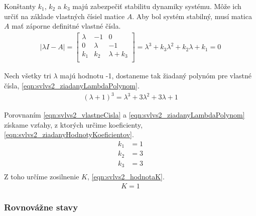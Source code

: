 \documentclass[../main.tex]{subfiles}
\begin{document}
Konštanty $k_1$, $k_2$ a $k_3$ majú zabezpečiť stabilitu dynamiky systému. Môže ich určiť na základe vlastných čísiel matice $A$. Aby bol systém stabilný, musí matica $A$ mať záporne definitné vlastné čísla.
	\begin{equation}
		\begin{aligned}
		|\lambda I-A| =
			\begin{bmatrix} 
			\lambda & -1 & 0 \\ 
			0 & \lambda & -1 \\ 
			k_1 & k_2 & \lambda+k_3  \\ 
			\end{bmatrix} = \lambda^3 + k_3 \lambda^2 +  k_2 \lambda + k_1 = 0
		\end{aligned}
		\label{eqn:svlvs2_vlastneCisla}
	\end{equation}

Nech všetky tri $\lambda$ majú hodnotu -1, dostaneme tak žiadaný polynóm pre vlastné čísla, \cref{eqn:svlvs2_ziadanyLambdaPolynom}.
	\begin{equation}
		\begin{aligned}
		(\lambda+1)^3 = \lambda^3 + 3 \lambda^2 +  3 \lambda + 1
		\end{aligned}
		\label{eqn:svlvs2_ziadanyLambdaPolynom}
	\end{equation}

Porovnaním \cref{eqn:svlvs2_vlastneCisla} a \cref{eqn:svlvs2_ziadanyLambdaPolynom} získame vzťahy, z ktorých určime koeficienty, \cref{eqn:svlvs2_ziadanyHodnotyKoeficientov}.
	\begin{equation}
		\begin{aligned}
		k_1 &= 1 							\\
		k_2 &= 3 							\\
		k_3 &= 3					 		\\
		\end{aligned}
		\label{eqn:svlvs2_ziadanyHodnotyKoeficientov}
	\end{equation}
Z toho určíme zosilnenie $K$, \cref{eqn:svlvs2_hodnotaK}.
	\begin{equation}
		\begin{aligned}
		K = 1
		\end{aligned}
		\label{eqn:svlvs2_hodnotaK}
	\end{equation}


\newpage

    \subsubsection{Rovnovážne stavy}
\end{document}
